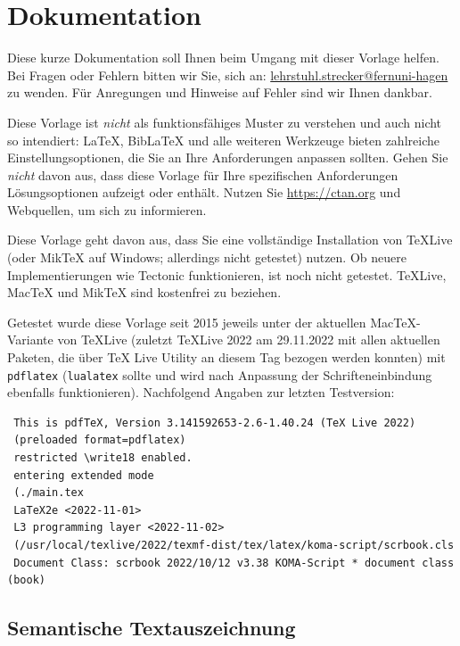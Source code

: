 

\lstset{language=C}

\chapter{Dokumentation}

Diese kurze Dokumentation soll Ihnen beim Umgang mit dieser Vorlage helfen. Bei Fragen oder Fehlern bitten wir Sie, sich an: \href{mailto:lehrstuhl.strecker@fernuni-hagen}{lehrstuhl.strecker@fernuni-hagen} zu wenden. Für Anregungen und Hinweise auf Fehler sind wir Ihnen dankbar.

Diese Vorlage ist \emph{nicht} als funktionsfähiges Muster zu verstehen und auch nicht so intendiert: LaTeX, BibLaTeX und alle weiteren Werkzeuge bieten zahlreiche Einstellungsoptionen, die Sie an Ihre Anforderungen anpassen sollten. Gehen Sie \emph{nicht} davon aus, dass diese Vorlage für Ihre spezifischen Anforderungen Lösungsoptionen aufzeigt oder enthält. Nutzen Sie \url{https://ctan.org} und Webquellen, um sich zu informieren.

Diese Vorlage geht davon aus, dass Sie eine vollständige Installation von TeXLive (oder MikTeX auf Windows; allerdings nicht getestet) nutzen. Ob neuere Implementierungen wie Tectonic funktionieren, ist noch nicht getestet. TeXLive, MacTeX und MikTeX sind kostenfrei zu beziehen.

Getestet wurde diese Vorlage seit 2015 jeweils unter der aktuellen MacTeX-Variante von TeXLive (zuletzt TeXLive 2022 am 29.11.2022 mit allen aktuellen Paketen, die über TeX Live Utility an diesem Tag bezogen werden konnten) mit \verb|pdflatex| (\verb|lualatex| sollte und wird nach Anpassung der Schrifteneinbindung ebenfalls funktionieren). Nachfolgend Angaben zur letzten Testversion:

\begin{verbatim}
 This is pdfTeX, Version 3.141592653-2.6-1.40.24 (TeX Live 2022) 
 (preloaded format=pdflatex)
 restricted \write18 enabled.
 entering extended mode
 (./main.tex
 LaTeX2e <2022-11-01>
 L3 programming layer <2022-11-02>
 (/usr/local/texlive/2022/texmf-dist/tex/latex/koma-script/scrbook.cls
 Document Class: scrbook 2022/10/12 v3.38 KOMA-Script * document class (book)

\end{verbatim}




\section{Semantische Textauszeichnung}
\label{sec:semant-textauszeichnung}

